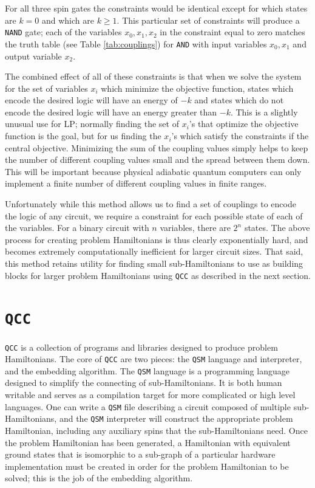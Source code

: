 For all three spin gates the constraints would be identical except for which states are $k = 0$ and which are $k \ge 1$.  This particular set of constraints will produce a \texttt{NAND} gate; each of the variables $x_0, x_1, x_2$ in the constraint equal to zero matches the truth table (see Table \ref{tab:couplings}) for \texttt{AND} with input variables $x_0, x_1$ and output variable $x_2$.

The combined effect of all of these constraints is that when we solve the system for the set of variables $x_i$ which minimize the objective function, states which encode the desired logic will have an energy of $-k$ and states which do not encode the desired logic will have an energy greater than $-k$.
This is a slightly unusual use for LP; normally finding the set of $x_i$'s that optimize the objective function is the goal, but for us finding the $x_i$'s which satisfy the constraints if the central objective.
Minimizing the sum of the coupling values simply helps to keep the number of different coupling values small and the spread between them down.  This will be important because physical adiabatic quantum computers can only implement a finite number of different coupling values in finite ranges. 

Unfortunately while this method allows us to find a set of couplings to encode the logic of any circuit, we require a constraint for each possible state of each of the variables.  For a binary circuit with $n$ variables, there are $2^n$ states.
The above process for creating problem Hamiltonians is thus clearly exponentially hard, and becomes extremely computationally inefficient for larger circuit sizes.
That said, this method retains utility for finding small sub-Hamiltonians to use as building blocks for larger problem Hamiltonians using \texttt{QCC} as described in the next section.

\section{\texttt{QCC}}
\texttt{QCC} is a collection of programs and libraries designed to produce problem Hamiltonians.  The core of \texttt{QCC} are two pieces: the \texttt{QSM} language and interpreter, and the embedding algorithm.  The \texttt{QSM} language is a programming language designed to simplify the connecting of sub-Hamiltonians.  It is both human writable and serves as a compilation target for more complicated or high level languages.  One can write a \texttt{QSM} file describing a circuit composed of multiple sub-Hamiltonians, and the \texttt{QSM} interpreter will construct the appropriate problem Hamiltonian, including any auxiliary spins that the sub-Hamiltonians need.  Once the problem Hamiltonian has been generated, a Hamiltonian with equivalent ground states that is isomorphic to a sub-graph of a particular hardware implementation must be created in order for the problem Hamiltonian to be solved; this is the job of the embedding algorithm.


